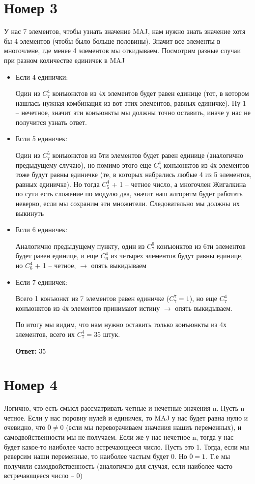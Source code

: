 \documentclass[a4paper,12pt]{article}
\begin{document}
\section*{Номер 3}
У нас 7 элементов, чтобы узнать значение MAJ, нам нужно знать значение хотя бы 4 элементов (чтобы было больше половины). Значит все элементы в многочлене, где менее 4 элементов мы откидываем. Посмотрим разные случаи при разном количестве единичек в MAJ
\begin{itemize}
\item Если 4 единички:

Один из $C_7^4$ конъюнктов из 4х элементов будет равен единице (тот, в котором нашлась нужная комбинация из вот этих элементов, равных единичке). Ну 1 -- нечетное, значит эти конъюнкты мы должны точно оставить, иначе у нас не получится узнать ответ.

\item Если 5 единичек:

Один из $C_7^5$ конъюнктов из 5ти элементов будет равен единице (аналогично предыдущему случаю), но помимо этого еще $C_5^4$ конъюнктов из 4х элементов тоже будут равны единичке (те, в которых набрались любые 4 из 5 элементов, равных единичке). Но тогда $C_5^4$ + 1 -- четное число, а многочлен Жигалкина по сути есть сложение по модулю два, значит наш алгоритм будет работать неверно, если мы сохраним эти множители. Следовательно мы должны их выкинуть

\item Если 6 единичек:

Аналогично предыдущему пункту, один из $C_7^6$ конъюнктов из 6ти элементов будет равен единице, и еще $C_6^4$ из четырех элементов будут равны единице, но $C_6^4$ + 1 -- четное, $\rightarrow$ опять выкидываем

\item Если 7 единичек:

Всего 1 конъюнкт из 7 элементов равен единичке ($C_7^7 = 1$), но еще $C_7^4$ конъюнктов из 4х элементов принимают истину $\rightarrow$ опять выкидываем.

По итогу мы видим, что нам нужно оставить только конъюнкты из 4х элементов, всего их $C_7^4 = 35$ штук.

\begin{center}
\textbf{Ответ: } $35$
\end{center}
\end{itemize}
\section*{Номер 4}
Логично, что есть смысл рассматривать четные и нечетные значения n. Пусть n -- четное. Если у нас поровну нулей и единичек, то MAJ у нас будет равна нулю и очевидно,  что $\overline{0} \neq 0$ (если мы переворачиваем значения нашиъ переменных), и самодвойственности мы не получаем. Если же у нас нечетное n, тогда у нас будет какое-то наиболее часто встречающееся число. Пусть это 1. Тогда, если мы реверсим наши переменные, то наиболее частым будет 0. Но $\overline{0} = 1$. Т.е мы получили самодвойственность (аналогично для случая, если наиболее часто встречающееся число -- 0)
\end{document}
